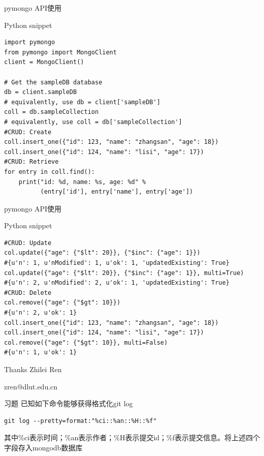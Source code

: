 \documentclass{beamer}
\begin{document}
\begin{frame}[t,fragile]{pymongo API使用}
	\begin{block}{Python snippet}
		\scriptsize
\begin{verbatim}
import pymongo
from pymongo import MongoClient
client = MongoClient()

# Get the sampleDB database
db = client.sampleDB 
# equivalently, use db = client['sampleDB']
coll = db.sampleCollection
# equivalently, use coll = db['sampleCollection']
#CRUD: Create
coll.insert_one({"id": 123, "name": "zhangsan", "age": 18})
coll.insert_one({"id": 124, "name": "lisi", "age": 17})
#CRUD: Retrieve
for entry in coll.find():
    print("id: %d, name: %s, age: %d" % 
          (entry['id'], entry['name'], entry['age'])
\end{verbatim}
	\end{block}
\end{frame}

\begin{frame}[t,fragile]{pymongo API使用}
	\begin{block}{Python snippet}
		\scriptsize
\begin{verbatim}
#CRUD: Update
col.update({"age": {"$lt": 20}}, {"$inc": {"age": 1}})
#{u'n': 1, u'nModified': 1, u'ok': 1, 'updatedExisting': True}
col.update({"age": {"$lt": 20}}, {"$inc": {"age": 1}}, multi=True)
#{u'n': 2, u'nModified': 2, u'ok': 1, 'updatedExisting': True}
#CRUD: Delete
col.remove({"age": {"$gt": 10}})
#{u'n': 2, u'ok': 1}
coll.insert_one({"id": 123, "name": "zhangsan", "age": 18})
coll.insert_one({"id": 124, "name": "lisi", "age": 17})
col.remove({"age": {"$gt": 10}}, multi=False)
#{u'n': 1, u'ok': 1}
\end{verbatim}
	\end{block}
\end{frame}

\begin{frame}
	\vspace{3cm}
	\Huge
	Thanks
	\vspace{2cm}
	\normalsize
	\flushright
		Zhilei Ren

		zren@dlut.edu.cn
	
\end{frame}
\begin{frame}[t,fragile]{习题}
	已知如下命令能够获得格式化git log

\begin{verbatim}
git log --pretty=format:"%ci::%an::%H::%f"
\end{verbatim}

其中\%ci表示时间；\%an表示作者；\%H表示提交id；\%f表示提交信息。将上述四个字段存入mongodb数据库



	
\end{frame}
\end{document}
